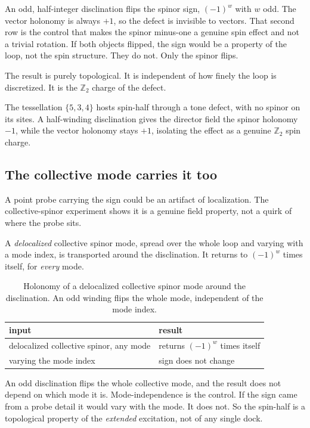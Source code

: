An odd, half-integer disclination flips the spinor sign, $(-1)^w$ with $w$ odd. The vector holonomy is always $+1$, so the defect is invisible to vectors. That second row is the control that makes the spinor minus-one a genuine spin effect and not a trivial rotation. If both objects flipped, the sign would be a property of the loop, not the spin structure. They do not. Only the spinor flips.

The result is purely topological. It is independent of how finely the loop is discretized. It is the $\mathbb{Z}_2$ charge of the defect.

\begin{result}
The tessellation $\{5,3,4\}$ hosts spin-half through a tone defect, with no spinor on its sites. A half-winding disclination gives the director field the spinor holonomy $-1$, while the vector holonomy stays $+1$, isolating the effect as a genuine $\mathbb{Z}_2$ spin charge.
\end{result}

\subsection{The collective mode carries it too}

A point probe carrying the sign could be an artifact of localization. The collective-spinor experiment shows it is a genuine field property, not a quirk of where the probe sits.

A \emph{delocalized} collective spinor mode, spread over the whole loop and varying with a mode index, is transported around the disclination. It returns to $(-1)^w$ times itself, for \emph{every} mode.

\begin{table}[ht]
\centering
\begin{tabular}{@{}ll@{}}
\toprule
input & result \\
\midrule
delocalized collective spinor, any mode & returns $(-1)^{w}$ times itself \\
varying the mode index & sign does not change \\
\bottomrule
\end{tabular}
\caption{Holonomy of a delocalized collective spinor mode around the disclination. An odd winding flips the whole mode, independent of the mode index.}
\label{tab:collective-534}
\end{table}

An odd disclination flips the whole collective mode, and the result does not depend on which mode it is. Mode-independence is the control. If the sign came from a probe detail it would vary with the mode. It does not. So the spin-half is a topological property of the \emph{extended} excitation, not of any single dock.

